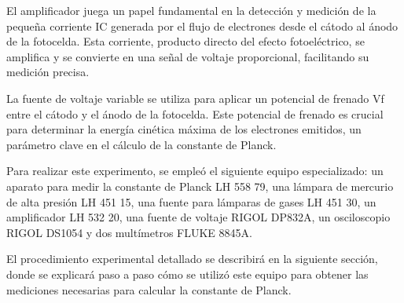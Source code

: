 \documentclass[twocolumn,a4paper,11pt]{scrartcl}
\begin{document}
El amplificador juega un papel fundamental en la detección y medición de la pequeña corriente IC generada por el flujo de electrones desde el cátodo al ánodo de la fotocelda. Esta corriente, producto directo del efecto fotoeléctrico, se amplifica y se convierte en una señal de voltaje proporcional, facilitando su medición precisa.

La fuente de voltaje variable se utiliza para aplicar un potencial de frenado Vf entre el cátodo y el ánodo de la fotocelda. Este potencial de frenado es crucial para determinar la energía cinética máxima de los electrones emitidos, un parámetro clave en el cálculo de la constante de Planck.

Para realizar este experimento, se empleó el siguiente equipo especializado: un aparato para medir la constante de Planck LH 558 79, una lámpara de mercurio de alta presión LH 451 15, una fuente para lámparas de gases LH 451 30, un amplificador LH 532 20, una fuente de voltaje RIGOL DP832A, un osciloscopio RIGOL DS1054 y dos multímetros FLUKE 8845A.

El procedimiento experimental detallado se describirá en la siguiente sección, donde se explicará paso a paso cómo se utilizó este equipo para obtener las mediciones necesarias para calcular la constante de Planck.
\end{document}
